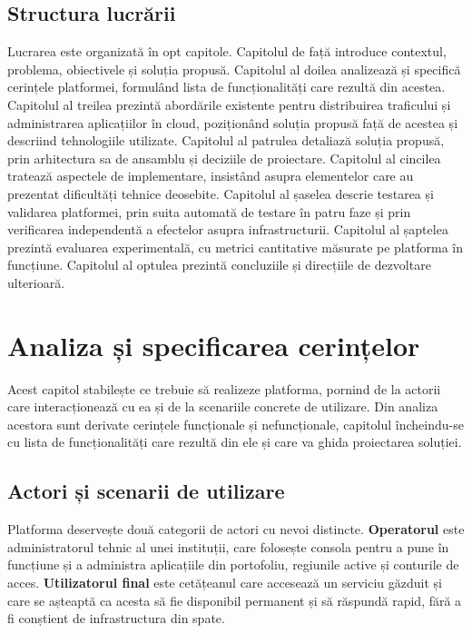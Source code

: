 \documentclass[12pt,a4paper]{report}
\begin{document}
\section{Structura lucrării}
Lucrarea este organizată în opt capitole. Capitolul de față introduce contextul, problema, obiectivele și soluția propusă. Capitolul al doilea analizează și specifică cerințele platformei, formulând lista de funcționalități care rezultă din acestea. Capitolul al treilea prezintă abordările existente pentru distribuirea traficului și administrarea aplicațiilor în cloud, poziționând soluția propusă față de acestea și descriind tehnologiile utilizate. Capitolul al patrulea detaliază soluția propusă, prin arhitectura sa de ansamblu și deciziile de proiectare. Capitolul al cincilea tratează aspectele de implementare, insistând asupra elementelor care au prezentat dificultăți tehnice deosebite. Capitolul al șaselea descrie testarea și validarea platformei, prin suita automată de testare în patru faze și prin verificarea independentă a efectelor asupra infrastructurii. Capitolul al șaptelea prezintă evaluarea experimentală, cu metrici cantitative măsurate pe platforma în funcțiune. Capitolul al optulea prezintă concluziile și direcțiile de dezvoltare ulterioară.

\chapter{Analiza și specificarea cerințelor}

Acest capitol stabilește ce trebuie să realizeze platforma, pornind de la actorii care interacționează cu ea și de la scenariile concrete de utilizare. Din analiza acestora sunt derivate cerințele funcționale și nefuncționale, capitolul încheindu-se cu lista de funcționalități care rezultă din ele și care va ghida proiectarea soluției.

\section{Actori și scenarii de utilizare}
Platforma deservește două categorii de actori cu nevoi distincte. \textbf{Operatorul} este administratorul tehnic al unei instituții, care folosește consola pentru a pune în funcțiune și a administra aplicațiile din portofoliu, regiunile active și conturile de acces. \textbf{Utilizatorul final} este cetățeanul care accesează un serviciu găzduit și care se așteaptă ca acesta să fie disponibil permanent și să răspundă rapid, fără a fi conștient de infrastructura din spate.
\end{document}
